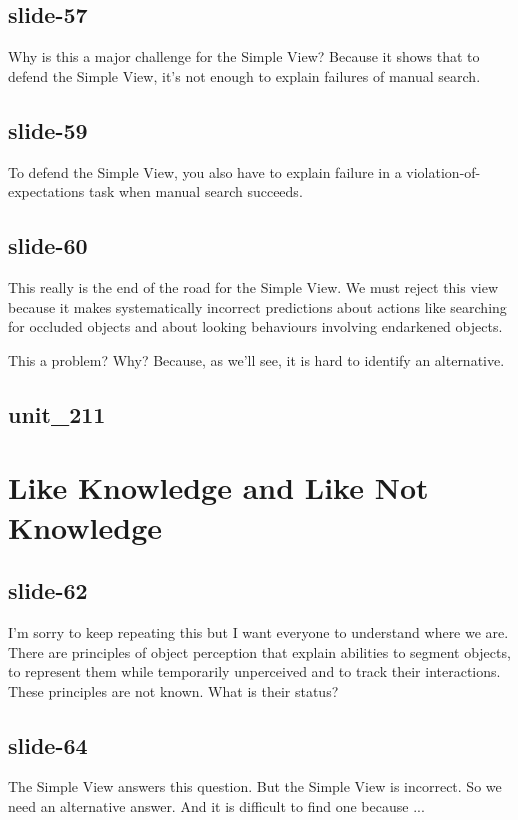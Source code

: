 \documentclass[12pt,\papersize]{extarticle}
\begin{document}
\subsection{slide-57}
Why is this a major challenge for the Simple View?
Because it shows that to defend the Simple View, it’s not enough to
explain failures of manual search.

\subsection{slide-59}
To defend the Simple View, you also have to explain failure in
a violation-of-expectations task when manual search succeeds.

\subsection{slide-60}
This really is the end of the road for the Simple View.
We must reject this view because it makes systematically incorrect
predictions about actions like searching for occluded objects and about
looking behaviours involving endarkened objects.

This a problem? Why? Because, as we'll see, it is hard to identify an
alternative.

\subsection{unit\_211}


\section{Like Knowledge and Like Not Knowledge}

\subsection{slide-62}
I'm sorry to keep repeating this but I want everyone to understand where we
are. There are principles of object perception that explain abilities to
segment objects, to represent them while temporarily unperceived and to
track their interactions. These principles are not known. What is their
status?

\subsection{slide-64}
The Simple View answers this question.
But the Simple View is incorrect.
So we need an alternative answer.
And it is difficult to find one because ...
\end{document}
